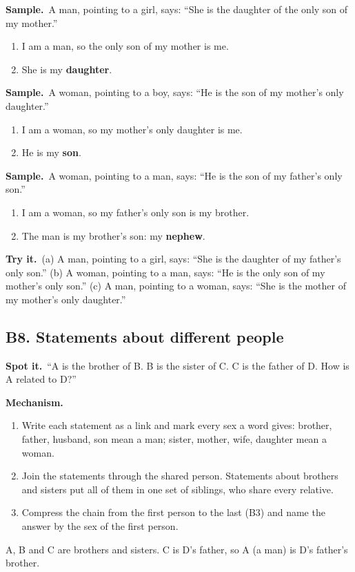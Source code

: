\documentclass[11pt,a4paper]{article}
\let\oldsubsection\subsection
\renewcommand{\subsection}{\needspace{9\baselineskip}\oldsubsection}
\newcommand{\spot}{\textbf{\color{ember}Spot it.}\ }
\newcommand{\mech}{\textbf{\color{ember}Mechanism.}\ }
\newif\ifkeepsamp
\newcommand{\samp}{\ifkeepsamp\needspace{4\baselineskip}\fi\textbf{\color{ember}Sample.}\ }
\newcommand{\tryit}[1]{\textbf{\color{ember}Try it.}\ #1}
\begin{document}
\samp A man, pointing to a girl, says: ``She is the daughter of the only son of my mother.''
\begin{enumerate}
\item I am a man, so the only son of my mother is me.
\item She is my \textbf{daughter}.
\end{enumerate}
\samp A woman, pointing to a boy, says: ``He is the son of my mother's only daughter.''
\begin{enumerate}
\item I am a woman, so my mother's only daughter is me.
\item He is my \textbf{son}.
\end{enumerate}
\samp A woman, pointing to a man, says: ``He is the son of my father's only son.''
\begin{enumerate}
\item I am a woman, so my father's only son is my brother.
\item The man is my brother's son: my \textbf{nephew}.
\end{enumerate}

\tryit (a) A man, pointing to a girl, says: ``She is the daughter of my father's only son.'' (b) A woman, pointing to a man, says: ``He is the only son of my mother's only son.'' (c) A man, pointing to a woman, says: ``She is the mother of my mother's only daughter.''

\subsection{B8. Statements about different people}
\spot ``A is the brother of B. B is the sister of C. C is the father of D. How is A related to D?''

\mech
\begin{enumerate}
\item Write each statement as a link and mark every sex a word gives: brother, father, husband, son mean a man; sister, mother, wife, daughter mean a woman.
\item Join the statements through the shared person. Statements about brothers and sisters put all of them in one set of siblings, who share every relative.
\item Compress the chain from the first person to the last (B3) and name the answer by the sex of the first person.
\end{enumerate}

\begin{center}
\par\nopagebreak\smallskip
{\small A, B and C are brothers and sisters. C is D's father, so A (a man) is D's father's brother.}
\end{center}
\end{document}
